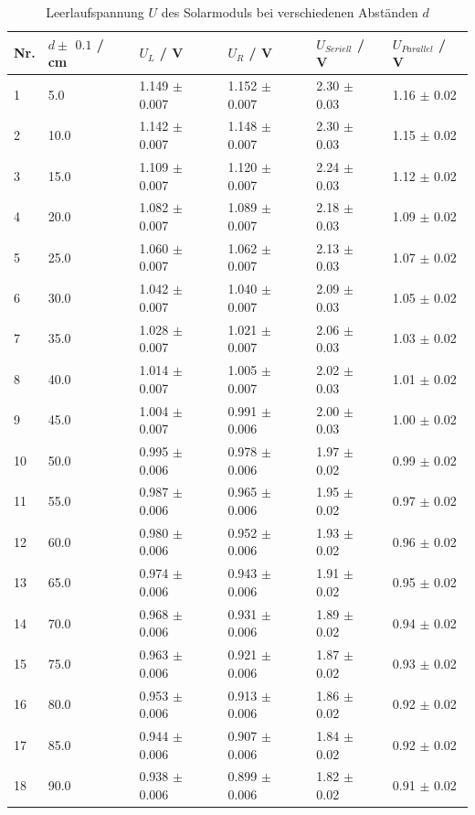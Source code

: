 \documentclass[12pt,a4paper,twoside]{article}
\begin{document}
\begin{table}[H]
    \centering
    \caption{Leerlaufspannung $U$ des Solarmoduls bei verschiedenen Abständen $d$}
    \label{tab:Messdaten Spannung Solar}
    \begin{tabular}{| l | l | l | l | l | l |}
        \hline
        Nr. & $d \pm $ $0.1 $ / cm & $U_{L}$ / V & $U_{R}$ / V & $U_{Seriell}$ / V & $U_{Parallel}$ / V \\
        \hline
        1  & 5.0  & 1.149 $\pm$ 0.007 & 1.152 $\pm$ 0.007 & 2.30 $\pm$ 0.03 & 1.16 $\pm$ 0.02   \\
        2  & 10.0 & 1.142 $\pm$ 0.007 & 1.148 $\pm$ 0.007 & 2.30 $\pm$ 0.03 & 1.15 $\pm$ 0.02   \\
        3  & 15.0 & 1.109 $\pm$ 0.007 & 1.120 $\pm$ 0.007 & 2.24 $\pm$ 0.03 & 1.12 $\pm$ 0.02   \\
        4  & 20.0 & 1.082 $\pm$ 0.007 & 1.089 $\pm$ 0.007 & 2.18 $\pm$ 0.03 & 1.09 $\pm$ 0.02   \\
        5  & 25.0 & 1.060 $\pm$ 0.007 & 1.062 $\pm$ 0.007 & 2.13 $\pm$ 0.03 & 1.07 $\pm$ 0.02   \\
        6  & 30.0 & 1.042 $\pm$ 0.007 & 1.040 $\pm$ 0.007 & 2.09 $\pm$ 0.03 & 1.05 $\pm$ 0.02   \\
        7  & 35.0 & 1.028 $\pm$ 0.007 & 1.021 $\pm$ 0.007 & 2.06 $\pm$ 0.03 & 1.03 $\pm$ 0.02   \\
        8  & 40.0 & 1.014 $\pm$ 0.007 & 1.005 $\pm$ 0.007 & 2.02 $\pm$ 0.03 & 1.01 $\pm$ 0.02   \\
        9  & 45.0 & 1.004 $\pm$ 0.007 & 0.991 $\pm$ 0.006 & 2.00 $\pm$ 0.03 & 1.00 $\pm$ 0.02   \\
        10 & 50.0 & 0.995 $\pm$ 0.006 & 0.978 $\pm$ 0.006 & 1.97 $\pm$ 0.02 & 0.99 $\pm$ 0.02   \\
        11 & 55.0 & 0.987 $\pm$ 0.006 & 0.965 $\pm$ 0.006 & 1.95 $\pm$ 0.02 & 0.97 $\pm$ 0.02   \\
        12 & 60.0 & 0.980 $\pm$ 0.006 & 0.952 $\pm$ 0.006 & 1.93 $\pm$ 0.02 & 0.96 $\pm$ 0.02   \\
        13 & 65.0 & 0.974 $\pm$ 0.006 & 0.943 $\pm$ 0.006 & 1.91 $\pm$ 0.02 & 0.95 $\pm$ 0.02   \\
        14 & 70.0 & 0.968 $\pm$ 0.006 & 0.931 $\pm$ 0.006 & 1.89 $\pm$ 0.02 & 0.94 $\pm$ 0.02   \\
        15 & 75.0 & 0.963 $\pm$ 0.006 & 0.921 $\pm$ 0.006 & 1.87 $\pm$ 0.02 & 0.93 $\pm$ 0.02   \\
        16 & 80.0 & 0.953 $\pm$ 0.006 & 0.913 $\pm$ 0.006 & 1.86 $\pm$ 0.02 & 0.92 $\pm$ 0.02   \\
        17 & 85.0 & 0.944 $\pm$ 0.006 & 0.907 $\pm$ 0.006 & 1.84 $\pm$ 0.02 & 0.92 $\pm$ 0.02   \\
        18 & 90.0 & 0.938 $\pm$ 0.006 & 0.899 $\pm$ 0.006 & 1.82 $\pm$ 0.02 & 0.91 $\pm$ 0.02   \\
        \hline
    \end{tabular}
\end{table}
\end{document}
